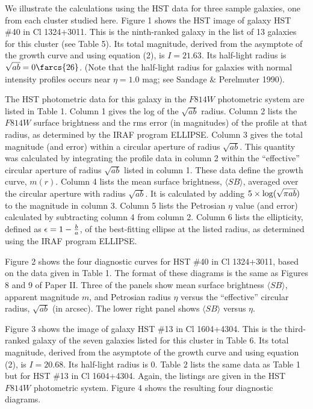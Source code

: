 \documentclass[preprint]{aastex}
\begin{document}
We illustrate the calculations using the HST data for three sample
galaxies, one from each cluster studied here. Figure 1 shows the HST
image of galaxy HST \#40 in Cl 1324+3011. This is the ninth-ranked
galaxy in the list of 13 galaxies for this cluster (see Table 5). Its
total magnitude, derived from the asymptote of the growth curve and
using equation (2), is $I = 21.63$. Its half-light radius is
$\sqrt{ab} = 0\farcs{26}$.  (Note that the half-light radius for
galaxies with normal intensity profiles occurs near $\eta = 1.0$ mag;
see Sandage \& Perelmuter 1990).

The HST photometric data for this galaxy in the $F814W$ photometric
system are listed in Table 1. Column 1 gives the log of the
$\sqrt{ab}$ radius. Column 2 lists the $F814W$ surface brightness and
the rms error (in magnitudes) of the profile at that radius, as
determined by the IRAF program ELLIPSE. Column 3 gives the total
magnitude (and error) within a circular aperture of radius
$\sqrt{ab}$. This quantity was calculated by integrating the profile
data in column 2 within the ``effective'' circular aperture of radius
$\sqrt{ab}$ listed in column 1. These data define the growth curve,
$m(r)$.  Column 4 lists the mean surface brightness, $\langle SB
\rangle$, averaged over the circular aperture with radius $\sqrt{ab}$.
It is calculated by adding $5 \times {\rm log} (\sqrt{\pi ab})$ to the
magnitude in column 3. Column 5 lists the Petrosian $\eta$ value (and
error) calculated by subtracting column 4 from column 2. Column 6
lists the ellipticity, defined as $\epsilon = 1-{b\over{a}}$, of the
best-fitting ellipse at the listed radius, as determined using the
IRAF program ELLIPSE.

Figure 2 shows the four diagnostic curves for HST \#40 in Cl
1324+3011, based on the data given in Table 1. The format of these
diagrams is the same as Figures 8 and 9 of Paper II. Three of the
panels show mean surface brightness $\langle SB \rangle$, apparent
magnitude $m$, and Petrosian radius $\eta$ versus the ``effective''
circular radius, $\sqrt{ab}$ (in arcsec). The lower right panel shows
$\langle SB \rangle$ versus $\eta$.

Figure 3 shows the image of galaxy HST \#13 in Cl 1604+4304. This is
the third-ranked galaxy of the seven galaxies listed for this cluster
in Table 6. Its total magnitude, derived from the asymptote of the
growth curve and using equation (2), is $I = 20.68$. Its half-light
radius is 0.  Table 2 lists the same data as Table 1 but for
HST \#13 in Cl 1604+4304. Again, the listings are given in the HST
$F814W$ photometric system. Figure 4 shows the resulting four
diagnostic diagrams.
\end{document}
